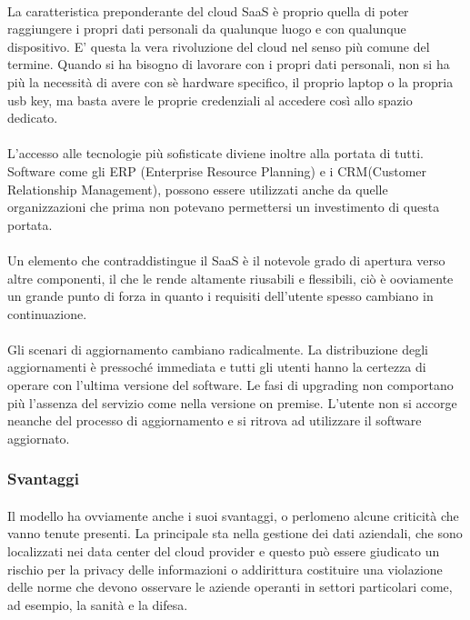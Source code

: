 \paragraph{}
La caratteristica preponderante del cloud SaaS è proprio quella di poter raggiungere i propri dati personali da qualunque luogo e con qualunque dispositivo. E' questa la vera rivoluzione del cloud nel senso più comune del termine. Quando si ha bisogno di lavorare con i propri dati personali, non si ha più la necessità di avere con sè hardware specifico, il proprio laptop o la propria usb key, ma basta avere le proprie credenziali al accedere così allo spazio dedicato. 
\paragraph{}
L'accesso alle tecnologie più sofisticate diviene inoltre alla portata di tutti. Software come gli ERP (Enterprise Resource Planning) e i CRM(Customer Relationship Management), possono essere utilizzati anche da quelle organizzazioni che prima non potevano permettersi un investimento di questa portata.
\paragraph{} 
Un elemento che contraddistingue il SaaS è il notevole grado di apertura verso altre componenti, il che le rende altamente riusabili e flessibili, ciò è ooviamente un grande punto di forza in quanto i requisiti dell'utente spesso cambiano in continuazione.
\paragraph{}
Gli scenari di aggiornamento cambiano radicalmente. La distribuzione degli aggiornamenti è pressoché immediata e tutti gli utenti hanno la certezza di operare con l'ultima versione del software. Le fasi di upgrading non comportano più l'assenza del servizio come nella versione on premise. L'utente non si accorge neanche del processo di aggiornamento e si ritrova ad utilizzare il software aggiornato.
\subsubsection{Svantaggi}
\paragraph{}
Il modello ha ovviamente anche i suoi svantaggi, o perlomeno alcune criticità che vanno tenute presenti. La principale sta nella gestione dei dati aziendali, che sono localizzati nei data center del cloud provider e questo può essere giudicato un rischio per la privacy delle informazioni o addirittura costituire una violazione delle norme che devono osservare le aziende operanti in settori particolari come, ad esempio, la sanità e la difesa.
